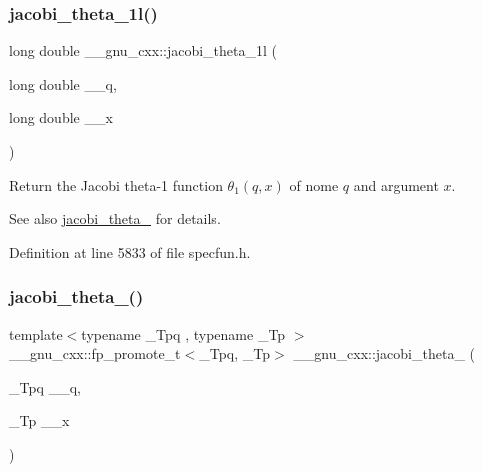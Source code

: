 \subsubsection{\texorpdfstring{jacobi\+\_\+theta\+\_\+1l()}{jacobi\_theta\_1l()}}
{\footnotesize\ttfamily long double \+\_\+\+\_\+gnu\+\_\+cxx\+::jacobi\+\_\+theta\+\_\+1l (\begin{DoxyParamCaption}\item[{long double}]{\+\_\+\+\_\+q,  }\item[{long double}]{\+\_\+\+\_\+x }\end{DoxyParamCaption})\hspace{0.3cm}{\ttfamily [inline]}}

Return the Jacobi theta-\/1 function $ \theta_1(q,x) $ of nome $ q $ and argument $ x $.

\begin{DoxySeeAlso}{See also}
\hyperlink{group__gnu__math__spec__func_ga996ca8c1fff75e2d4f196e99e0919933}{jacobi\+\_\+theta\+\_} for details. 
\end{DoxySeeAlso}


Definition at line 5833 of file specfun.\+h.

\mbox{\label{group__gnu__math__spec__func_gaf6b13dac1f112a870299d75cb4cf42cc}} 
\subsubsection{\texorpdfstring{jacobi\+\_\+theta\+\_()}{jacobi\_theta\_2()}}
{\footnotesize\ttfamily template$<$typename \+\_\+\+Tpq , typename \+\_\+\+Tp $>$ \\
\+\_\+\+\_\+gnu\+\_\+cxx\+::fp\+\_\+promote\+\_\+t$<$\+\_\+\+Tpq, \+\_\+\+Tp$>$ \+\_\+\+\_\+gnu\+\_\+cxx\+::jacobi\+\_\+theta\+\_ (\begin{DoxyParamCaption}\item[{\+\_\+\+Tpq}]{\+\_\+\+\_\+q,  }\item[{\+\_\+\+Tp}]{\+\_\+\+\_\+x }\end{DoxyParamCaption})\hspace{0.3cm}{\ttfamily [inline]}}

